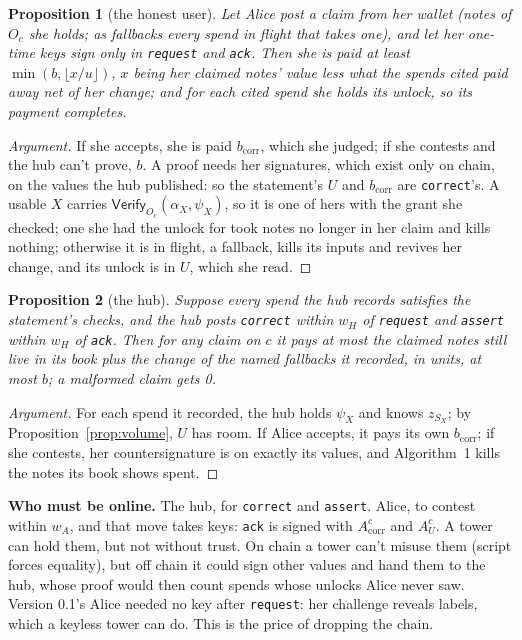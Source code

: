 \documentclass[11pt]{article}
\theoremstyle{plain}
\newtheorem{proposition}{Proposition}
\theoremstyle{definition}
\newcommand{\bcorr}{b_{\mathrm{corr}}}
\newcommand{\tx}[1]{\texttt{#1}}
\newcommand{\Vfy}{\mathsf{Verify}}
\newcommand{\Oc}{O_c}
\newcommand{\Acorr}{A_{\mathrm{corr}}^{c}}
\newcommand{\AU}{A_{U}^{c}}
\begin{document}
\begin{proposition}[the honest user]\label{prop:user}
Let Alice post a claim from her wallet (notes of $\Oc$ she holds; as
fallbacks every spend in flight that takes one), and let her one-time
keys sign only in \tx{request} and \tx{ack}. Then she is paid at least
$\min(b, \lfloor x/u \rfloor)$, $x$ being her claimed notes' value less
what the spends cited paid away net of her change; and for each cited
spend she holds its unlock, so its payment completes.
\end{proposition}
\begin{proof}[Argument]
If she accepts, she is paid $\bcorr$, which she judged; if she contests
and the hub can't prove, $b$. A proof needs her signatures, which exist
only on chain, on the values the hub published: so the statement's $U$
and $\bcorr$ are \tx{correct}'s. A usable $X$ carries $\Vfy_{\Oc}(\alpha_X,
\psi_X)$, so it is one of hers with the grant she checked; one she had
the unlock for took notes no longer in her claim and kills nothing;
otherwise it is in flight, a fallback, kills its inputs and revives her
change, and its unlock is in $U$, which she read.
\end{proof}

\begin{proposition}[the hub]\label{prop:hub}
Suppose every spend the hub records satisfies the statement's checks,
and the hub posts \tx{correct} within $w_H$ of \tx{request} and
\tx{assert} within $w_H$ of \tx{ack}. Then for any claim on $c$ it pays
at most the claimed notes still live in its book plus the change of the
named fallbacks it recorded, in units, at most $b$; a malformed claim
gets 0.
\end{proposition}
\begin{proof}[Argument]
For each spend it recorded, the hub holds $\psi_X$ and knows $z_{S_X}$;
by Proposition~\ref{prop:volume}, $U$ has room. If Alice accepts, it
pays its own $\bcorr$; if she contests, her countersignature is on
exactly its values, and Algorithm~1 kills the notes its book shows spent.
\end{proof}

\textbf{Who must be online.} The hub, for \tx{correct} and \tx{assert}.
Alice, to contest within $w_A$, and that move takes keys: \tx{ack} is
signed with $\Acorr$ and $\AU$. A tower can hold them, but not without
trust. On chain a tower can't misuse them (script forces equality), but
off chain it could sign other values and hand them to the hub, whose
proof would then count spends whose unlocks Alice never saw. Version
0.1's Alice needed no key after \tx{request}: her challenge reveals
labels, which a keyless tower can do. This is the price of dropping the
chain.
\end{document}

